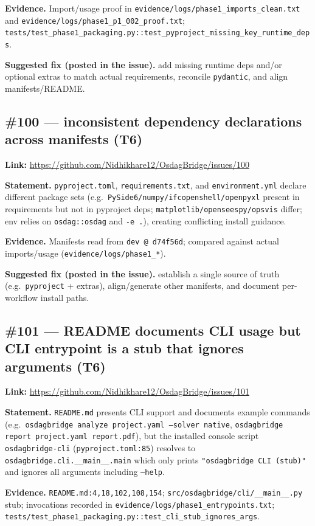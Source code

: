 \textbf{Evidence.} Import/usage proof in \texttt{evidence/logs/phase1\_imports\_clean.txt} and \texttt{evidence/logs/phase1\_p1\_002\_proof.txt}; \texttt{tests/test\_phase1\_packaging.py::test\_pyproject\_missing\_key\_runtime\_deps}.

\textbf{Suggested fix (posted in the issue).} add missing runtime deps and/or optional extras to match actual requirements, reconcile \texttt{pydantic}, and align manifests/README.

\subsection{\#100 --- inconsistent dependency declarations across manifests (T6)}
\textbf{Link:} \url{https://github.com/Nidhikhare12/OsdagBridge/issues/100}

\textbf{Statement.} \texttt{pyproject.toml}, \texttt{requirements.txt}, and \texttt{environment.yml} declare different package sets (e.g.\ \texttt{PySide6/numpy/ifcopenshell/openpyxl} present in requirements but not in pyproject deps; \texttt{matplotlib/openseespy/opsvis} differ; env relies on \texttt{osdag::osdag} and \texttt{-e .}), creating conflicting install guidance.

\textbf{Evidence.} Manifests read from \texttt{dev @ d74f56d}; compared against actual imports/usage (\texttt{evidence/logs/phase1\_*}).

\textbf{Suggested fix (posted in the issue).} establish a single source of truth (e.g.\ \texttt{pyproject} + extras), align/generate other manifests, and document per-workflow install paths.

\subsection{\#101 --- README documents CLI usage but CLI entrypoint is a stub that ignores arguments (T6)}
\textbf{Link:} \url{https://github.com/Nidhikhare12/OsdagBridge/issues/101}

\textbf{Statement.} \texttt{README.md} presents CLI support and documents example commands (e.g.\ \texttt{osdagbridge analyze project.yaml --solver native}, \texttt{osdagbridge report project.yaml report.pdf}), but the installed console script \texttt{osdagbridge-cli} (\texttt{pyproject.toml:85}) resolves to \texttt{osdagbridge.cli.\_\_main\_\_.main} which only prints \texttt{"osdagbridge CLI (stub)"} and ignores all arguments including \texttt{--help}.

\textbf{Evidence.} \texttt{README.md:4,18,102,108,154}; \texttt{src/osdagbridge/cli/\_\_main\_\_.py} stub; invocations recorded in \texttt{evidence/logs/phase1\_entrypoints.txt}; \texttt{tests/test\_phase1\_packaging.py::test\_cli\_stub\_ignores\_args}.


